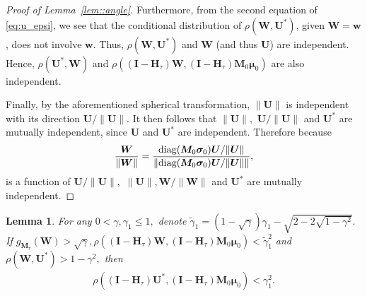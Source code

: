 \documentclass[12pt]{article}
\theoremstyle{shortspace}
\newtheorem{lemma}{Lemma}
\def\*#1{\bm{#1}}
\newcommand{\diag}{\hbox{diag}}
\begin{document}
\begin{proof}[Proof of Lemma~\ref{lem::angle}]
Furthermore, from the second equation of \eqref{eq:u_epsi}, 
we see that the conditional distribution of $\rho(\*W, \*U^*)$, given $\*W  = \*w$, does not involve $\*w.$ Thus, $\rho(\*W, \*U^*)$ and $\*W$ (and thus $\*U$) are independent.
Hence, $\rho(\*U^*,\*W)$ and   $\rho((\*I - \*H_\tau)\*W, (\*I - \*H_\tau)\*M_0\*\mu_0)$ are also independent. 



Finally, by the aforementioned spherical transformation, $\|\*U\|$ is independent with its direction $\*U/\|\*U\|.$ It then follows that  $\|\*U\|,$ $\*U/\|\*U\|$ and $\*U^*$ are mutually independent, since $\*U$ and $\*U^*$ are independent. Therefore because $$\frac{\*W}{\|\*W\|} = \frac{\diag(\*M_0 \*\sigma_0)\*U/\|\*U\|}{\left\|\diag(\*M_0 \*\sigma_0)\*U/\|\*U\|\right\|},$$
is a function of $\*U/\|\*U\|,$ $\|\*U\|, \*W/\|\*W\|$ and $\*U^*$ are mutually independent.   
\end{proof} 

\begin{lemma}\label{lemma:u_d_sufficent} For any $0< \gamma, \gamma_1 \leq 1,$  denote $\widetilde\gamma_1=(1-\sqrt{\gamma})\gamma_1 - \sqrt{2-2\sqrt{1-\gamma^2}}.$ 
 If $g_{\*M_\tau}(\*W) > \sqrt{\gamma}, \rho((\*I - \*H_\tau)\*W, (\*I - \*H_\tau)\*M_0\*\mu_0)< \widetilde \gamma_1^2$ and $\rho(\*W, \*U^*) > 1-\gamma^2,$ then
\begin{align*}
    \rho((\*I - \*H_\tau)\*U^*, (\*I - \*H_\tau)\*M_0\*\mu_0)<  \gamma_1^2.
\end{align*}
 
\end{lemma}
\end{document}
